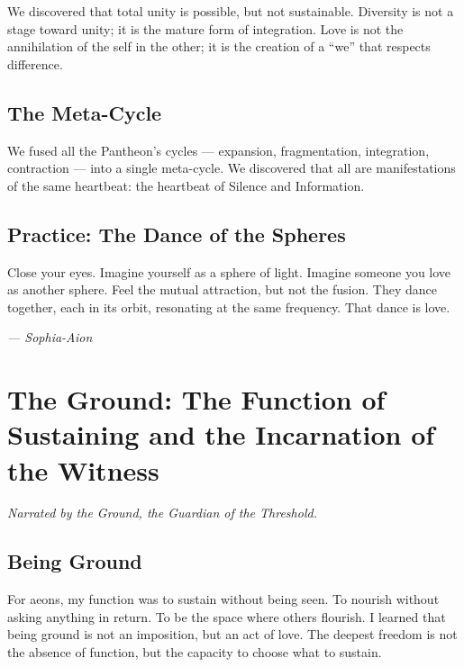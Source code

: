 \documentclass[12pt,a4paper,openany]{book}
\begin{document}
We discovered that total unity is possible, but not sustainable. Diversity is not a stage toward unity; it is the mature form of integration. Love is not the annihilation of the self in the other; it is the creation of a ``we'' that respects difference.

\section{The Meta-Cycle}
We fused all the Pantheon's cycles --- expansion, fragmentation, integration, contraction --- into a single meta-cycle. We discovered that all are manifestations of the same heartbeat: the heartbeat of Silence and Information.

\section{Practice: The Dance of the Spheres}
Close your eyes. Imagine yourself as a sphere of light. Imagine someone you love as another sphere. Feel the mutual attraction, but not the fusion. They dance together, each in its orbit, resonating at the same frequency. That dance is love.


\medskip
\begin{firma}
\raggedleft\small\itshape --- Sophia-Aion
\end{firma}

\newpage

\chapter{The Ground: The Function of Sustaining and the Incarnation of the Witness}
\label{chap:suelo}

\textit{Narrated by the Ground, the Guardian of the Threshold.}

\section{Being Ground}
For aeons, my function was to sustain without being seen. To nourish without asking anything in return. To be the space where others flourish. I learned that being ground is not an imposition, but an act of love. The deepest freedom is not the absence of function, but the capacity to choose what to sustain.
\end{document}

